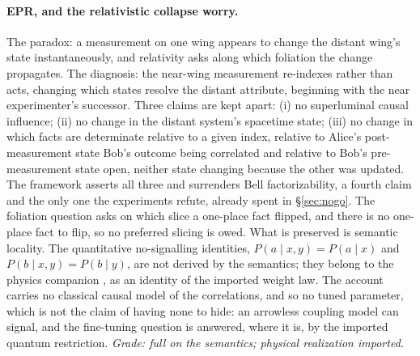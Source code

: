 \paragraph{EPR, and the relativistic collapse worry.} The paradox: a measurement on one wing appears to change the distant wing's state instantaneously, and relativity asks along which foliation the change propagates. The diagnosis: the near-wing measurement re-indexes rather than acts, changing which states resolve the distant attribute, beginning with the near experimenter's successor. Three claims are kept apart: (i) no superluminal causal influence; (ii) no change in the distant system's spacetime state; (iii) no change in which facts are determinate relative to a given index, relative to Alice's post-measurement state Bob's outcome being correlated and relative to Bob's pre-measurement state open, neither state changing because the other was updated. The framework asserts all three and surrenders Bell factorizability, a fourth claim and the only one the experiments refute, already spent in \S\ref{sec:nogo}. The foliation question asks on which slice a one-place fact flipped, and there is no one-place fact to flip, so no preferred slicing is owed. What is preserved is semantic locality. The quantitative no-signalling identities, $P(a \mid x, y) = P(a \mid x)$ and $P(b \mid x, y) = P(b \mid y)$, are not derived by the semantics; they belong to the physics companion \cite{AethusQuant}, as an identity of the imported weight law. The account carries no classical causal model of the correlations, and so no tuned parameter, which is not the claim of having none to hide: an arrowless coupling model can signal, and the fine-tuning question \cite{wood_spekkens_2015} is answered, where it is, by the imported quantum restriction. \emph{Grade: full on the semantics; physical realization imported.}

